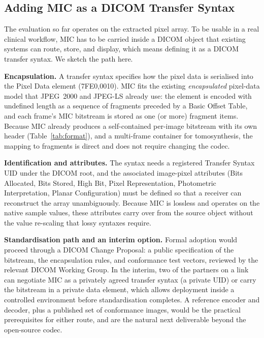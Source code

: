 \documentclass[journal]{IEEEtran}
\begin{document}
\subsection{Adding MIC as a DICOM Transfer Syntax}

The evaluation so far operates on the extracted pixel array. To be usable in a
real clinical workflow, MIC has to be carried inside a DICOM object that
existing systems can route, store, and display, which means defining it as a
DICOM transfer syntax. We sketch the path here.

\textbf{Encapsulation.} A transfer syntax specifies how the pixel data is
serialised into the Pixel Data element (7FE0,0010). MIC fits the existing
\emph{encapsulated} pixel-data model that JPEG~2000 and JPEG-LS already use:
the element is encoded with undefined length as a sequence of fragments
preceded by a Basic Offset Table, and each frame's MIC bitstream is stored as
one (or more) fragment items. Because MIC already produces a self-contained
per-image bitstream with its own header (Table~\ref{tab:format}), and a
multi-frame container for tomosynthesis, the mapping to fragments is direct and
does not require changing the codec.

\textbf{Identification and attributes.} The syntax needs a registered Transfer
Syntax UID under the DICOM root, and the associated image-pixel attributes
(Bits Allocated, Bits Stored, High Bit, Pixel Representation, Photometric
Interpretation, Planar Configuration) must be defined so that a receiver can
reconstruct the array unambiguously. Because MIC is lossless and operates on
the native sample values, these attributes carry over from the source object
without the value re-scaling that lossy syntaxes require.

\textbf{Standardisation path and an interim option.} Formal adoption would
proceed through a DICOM Change Proposal: a public specification of the
bitstream, the encapsulation rules, and conformance test vectors, reviewed by
the relevant DICOM Working Group. In the interim, two of the partners on a link
can negotiate MIC as a privately agreed transfer syntax (a private UID) or carry
the bitstream in a private data element, which allows deployment inside a
controlled environment before standardisation completes. A reference encoder and
decoder, plus a published set of conformance images, would be the practical
prerequisites for either route, and are the natural next deliverable beyond the
open-source codec.

\end{document}
